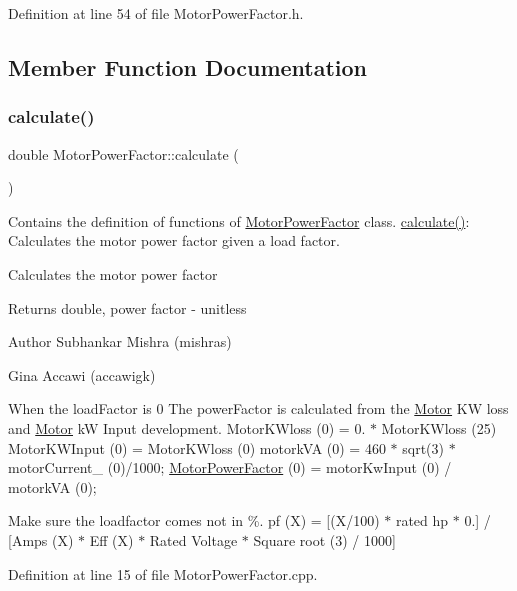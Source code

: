 Definition at line 54 of file Motor\+Power\+Factor.\+h.



\subsection{Member Function Documentation}
\mbox{\label{class_motor_power_factor_ac9d5742db4a371bc4e15d5b29d335b6e}} 
\subsubsection{\texorpdfstring{calculate()}{calculate()}}
{\footnotesize\ttfamily double Motor\+Power\+Factor\+::calculate (\begin{DoxyParamCaption}{ }\end{DoxyParamCaption})}



Contains the definition of functions of \hyperlink{class_motor_power_factor}{Motor\+Power\+Factor} class. \hyperlink{class_motor_power_factor_ac9d5742db4a371bc4e15d5b29d335b6e}{calculate()}\+: Calculates the motor power factor given a load factor. 

Calculates the motor power factor \begin{DoxyReturn}{Returns}
double, power factor -\/ unitless
\end{DoxyReturn}
\begin{DoxyAuthor}{Author}
Subhankar Mishra (mishras) 

Gina Accawi (accawigk) 
\end{DoxyAuthor}
When the load\+Factor is 0 The power\+Factor is calculated from the \hyperlink{struct_motor}{Motor} KW loss and \hyperlink{struct_motor}{Motor} kW Input development. Motor\+K\+Wloss (0) = 0. $\ast$ Motor\+K\+Wloss (25) Motor\+K\+W\+Input (0) = Motor\+K\+Wloss (0) motork\+VA (0) = 460 $\ast$ sqrt(3) $\ast$ motor\+Current\+\_\+ (0)/1000; \hyperlink{class_motor_power_factor}{Motor\+Power\+Factor} (0) = motor\+Kw\+Input (0) / motork\+VA (0);

Make sure the loadfactor comes not in \%. pf (X) = \mbox{[}(X/100) $\ast$ rated hp $\ast$ 0.\mbox{]} / \mbox{[}Amps (X) $\ast$ Eff (X) $\ast$ Rated Voltage $\ast$ Square root (3) / 1000\mbox{]}

Definition at line 15 of file Motor\+Power\+Factor.\+cpp.

